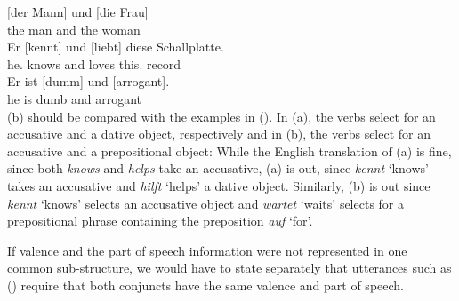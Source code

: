 \eal
\ex 
\gll {}[der Mann] und [die Frau]\\
	 {}\spacebr{}the man and \spacebr{}the woman\\
\ex 
\gll Er [kennt] und [liebt] diese Schallplatte.\\
	 he.\nom{} \spacebr{}knows and \spacebr{}loves this.\acc{} record\\
\ex 
\gll Er ist [dumm] und [arrogant].\\
	he is \spacebr{}dumb and \spacebr{}arrogant\\
\zl
\largerpage
(b) should be compared with the examples in (). In (a), the verbs select for an
accusative and a dative object, respectively and in (b), the verbs select for an accusative
and a prepositional object:
\eal
{}
\zl
While the English translation of (a) is fine, since both \emph{knows} and \emph{helps} take an
accusative, (a) is out, since \emph{kennt} `knows' takes an accusative and \emph{hilft}
`helps' a dative object. Similarly, (b) is out since \emph{kennt} `knows' selects an accusative object and
\emph{wartet} `waits' selects for a prepositional phrase containing the preposition \emph{auf} `for'.

If valence and the part of speech information were not represented in one common sub-structure, we would
have to state separately that utterances such as () require that both
conjuncts have the same valence and part of speech.

